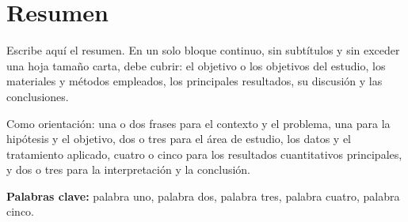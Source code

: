 %

\chapter{Resumen}

Escribe aquí el resumen. En un solo bloque continuo, sin subtítulos y sin
exceder una hoja tamaño carta, debe cubrir: el objetivo o los objetivos del
estudio, los materiales y métodos empleados, los principales resultados, su
discusión y las conclusiones.

Como orientación: una o dos frases para el contexto y el problema, una para la
hipótesis y el objetivo, dos o tres para el área de estudio, los datos y el
tratamiento aplicado, cuatro o cinco para los resultados cuantitativos
principales, y dos o tres para la interpretación y la conclusión.

\vspace{1em}
\noindent\textbf{Palabras clave:} palabra uno, palabra dos, palabra tres,
palabra cuatro, palabra cinco.
